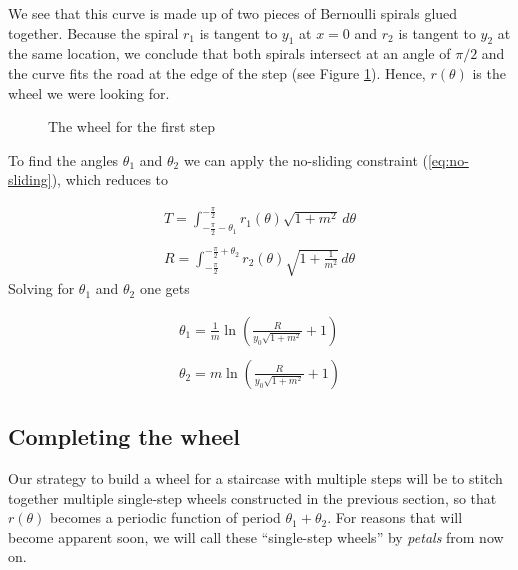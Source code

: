 \documentclass{article}
\theoremstyle{theorem}
\theoremstyle{theorem}
\begin{document}
We see that this curve is made up of
two pieces of Bernoulli spirals glued together. Because the spiral
$r_1$ is tangent to $y_1$ at $x=0$ and $r_2$ is tangent to $y_2$ at
the same location, we conclude that both spirals intersect at an angle
of $\pi/2$ and the curve fits the road at the edge of the step (see
Figure \ref{fig:petal}). Hence,
$r(\theta)$ is the wheel we were looking for.

\begin{figure}[h]
\centering

\caption{The wheel for the first step}
\label{fig:petal}
\end{figure}

To find the angles $\theta_1$ and $\theta_2$ we can apply the no-sliding constraint (\ref{eq:no-sliding}), which reduces to

\begin{equation}
  \begin{array}{c}
    \displaystyle T=\int^{-\frac{\pi}{2}}_{-\frac{\pi}{2}-\theta_1}r_1(\theta)\sqrt{1+m^2}
    \,d\theta\\
    \\
    \displaystyle R=\int^{-\frac{\pi}{2}+\theta_2}_{-\frac{\pi}{2}}r_2(\theta)\sqrt{1+\frac{1}{m^2}} \,d\theta
  \end{array}
\end{equation}
Solving for $\theta_1$ and $\theta_2$ one gets

\begin{equation}
  \label{eq:thetas}
  \begin{array}{c}
    \displaystyle
    \theta_1=\frac{1}{m}\ln\left(\frac{R}{y_0\sqrt{1+m^2}}+1\right) \\
    \\
    \displaystyle \theta_2=m\ln\left(\frac{R}{y_0\sqrt{1+m^2}}+1\right)
  \end{array}
\end{equation}


\subsection{Completing the wheel}

Our strategy to build a wheel for a staircase with multiple steps will
be to stitch together multiple single-step wheels constructed in the
previous section, so that $r(\theta)$ becomes a periodic function of
period $\theta_1+\theta_2$. For reasons that will become apparent
soon, we will call these ``single-step wheels'' by \emph{petals} from
now on.
\end{document}
